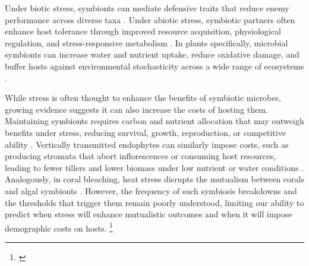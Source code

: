 \documentclass[12pt]{article}\usepackage[]{graphicx}\usepackage[dvipsnames]{xcolor}
\newcommand{\jacob}[2]{{\color{blue}{#1}}\footnote{\textit{\color{blue}{#2}}}}
\begin{document}
Under biotic stress, symbionts can mediate defensive traits that reduce enemy performance across diverse taxa \citep{atala2022fungal,bastias2017epichloe,vega2008insect,haine2008symbiont,florez2015defensive}.
Under abiotic stress, symbiotic partners often enhance host tolerance through improved resource acquisition, physiological regulation, and stress-responsive metabolism \citep{clay2002evolutionary, afkhami2008symbiosis,cesar2024defensive}.
In plants specifically, microbial symbionts can increase water and nutrient uptake, reduce oxidative damage, and buffer hosts against environmental stochasticity across a wide range of ecosystems \citep{amijee1989development,ruiz1996superoxide,fowler2023geographic,li2026climate}.

While stress is often thought to enhance the benefits of symbiotic microbes, growing evidence suggests it can also increase the costs of hosting them.
Maintaining symbionts requires carbon and nutrient allocation that may outweigh benefits under stress, reducing survival, growth, reproduction, or competitive ability \citep{johnson1997functioning, bronstein2001exploitation, klironomos2003variation,thirkell2020carbon}.
Vertically transmitted endophytes can similarly impose costs, such as producing stromata that abort inflorescences or consuming host resources, leading to fewer tillers and lower biomass under low nutrient or water conditions \citep{saikkonen2004evolution, ahlholm2002vertically}.
Analogously, in coral bleaching, heat stress disrupts the mutualism between corals and algal symbionts \citep{vidal2009coral, marangon2025destabilization}.
However, the frequency of such symbiosis breakdowns and the thresholds that trigger them remain poorly understood, limiting our ability to predict when stress will enhance mutualistic outcomes and when it will impose demographic costs on hosts.
\jacob{}{I considered adding a sentence here on soil microbial communities to motivate the greenhouse experiment, but decided against it. Since the soil origin result is a null finding, extensive theoretical motivation in the intro feels disproportionate to its role in the paper, and it would disrupt the flow of this paragraph. I introduce the rationale briefly in the Methods instead. Please let me know if you disagree.}
\end{document}
